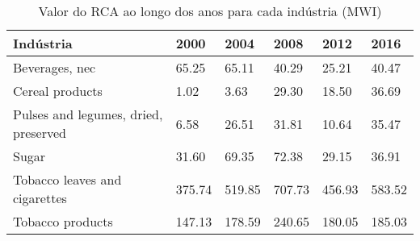 \begin{table}
\centering
\caption{Valor do RCA ao longo dos anos para cada indústria (MWI)}
\label{tab:ex3-tempo-MWI}
\begin{tabular}{p{6cm}p{1.5cm}p{1.5cm}p{1.5cm}p{1.5cm}p{1.5cm}}
\toprule
                           Indústria &   2000 &   2004 &   2008 &   2012 &   2016 \\
\midrule
                      Beverages, nec &  65.25 &  65.11 &  40.29 &  25.21 &  40.47 \\
                     Cereal products &   1.02 &   3.63 &  29.30 &  18.50 &  36.69 \\
Pulses and legumes, dried, preserved &   6.58 &  26.51 &  31.81 &  10.64 &  35.47 \\
                               Sugar &  31.60 &  69.35 &  72.38 &  29.15 &  36.91 \\
       Tobacco leaves and cigarettes & 375.74 & 519.85 & 707.73 & 456.93 & 583.52 \\
                    Tobacco products & 147.13 & 178.59 & 240.65 & 180.05 & 185.03 \\
\bottomrule
\end{tabular}
\end{table}
